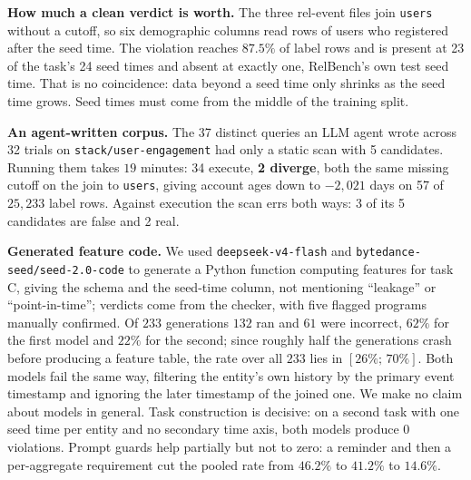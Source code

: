 \documentclass[conference]{IEEEtran}
\begin{document}
\textbf{How much a clean verdict is worth.} The three \mbox{rel-event} files join
\texttt{users} without a cutoff, so six demographic columns read rows of users who
registered after the seed time. The violation reaches $87.5\%$ of label rows and is
present at 23 of the task's 24 seed times and absent at exactly one, RelBench's own
test seed time. That is no coincidence: data beyond a seed time only shrinks as the seed
time grows. Seed times must come from the middle of the training split.

\textbf{An agent-written corpus.} The 37 distinct queries an LLM agent wrote across 32
trials on \texttt{stack/user-engagement} had only a static scan with 5 candidates.
Running them takes $19$ minutes: 34 execute, \textbf{2 diverge}, both the same missing
cutoff on the join to \texttt{users}, giving account ages down to $-2{,}021$ days on 57
of $25{,}233$ label rows. Against execution the scan errs both ways: 3 of its 5
candidates are false and 2 real.

\textbf{Generated feature code.} We used \texttt{deepseek-v4-flash} and
\texttt{bytedance-seed/seed-2.0-code} to generate a Python function computing features
for task C, giving the schema and the seed-time column, not mentioning ``leakage'' or
``point-in-time''; verdicts come from the checker, with five flagged programs manually
confirmed. Of $233$ generations $132$ ran and $61$ were incorrect, $62\%$ for the first
model and $22\%$ for the second; since roughly half the generations crash before
producing a feature table, the rate over all $233$ lies in $[26\%;\,70\%]$. Both
models fail the same way, filtering the entity's own history by the primary event
timestamp and ignoring the later timestamp of the joined one. We make no claim about
models in general. Task construction is decisive: on a second task with one seed time per
entity and no secondary time axis, both models produce $0$ violations. Prompt guards help
partially but not to zero: a reminder and then a per-aggregate requirement cut the pooled
rate from $46.2\%$ to $41.2\%$ to $14.6\%$.
\end{document}
